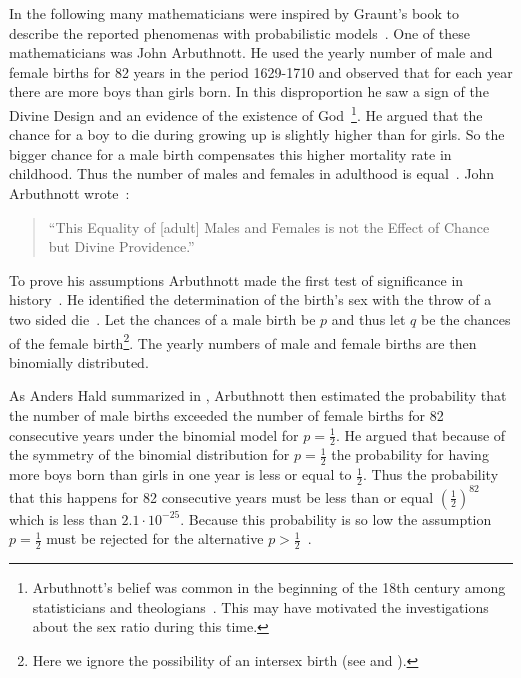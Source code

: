 In the following many mathematicians were inspired by Graunt's book to describe the reported phenomenas with probabilistic models~\cite[p. 275]{hald1}. One of these mathematicians was John Arbuthnott. He used the yearly number of male and female births for 82 years in the period 1629-1710 and observed that for each year there are more boys than girls born. In this disproportion he saw a sign of the Divine Design and an evidence of the existence of God~\cite[p. 277]{hald1}\footnote{Arbuthnott's belief was common in the beginning of the 18th century among statisticians and theologians~\cite[p.~285]{hald1}. This may have motivated the investigations about the sex ratio during this time.}. He argued that the chance for a boy to die during growing up is slightly higher than for girls. So the bigger chance for a male birth compensates this higher mortality rate in childhood. Thus the number of males and females in adulthood is equal~\cite[p. 277]{hald1}. John Arbuthnott wrote~\cite[p. 275]{hald1}:

\begin{quote}
    ``This Equality of [adult] Males and Females is not the Effect of Chance but Divine Providence.''
\end{quote}

To prove his assumptions Arbuthnott made the first test of significance in history~\cite[p. 276]{hald1}. He identified the determination of the birth's sex with the throw of a two sided die~\cite[pp. 275-276]{hald1}. Let the chances of a male birth be $p$ and thus let $q$ be the chances of the female birth\footnote{Here we ignore the possibility of an intersex birth (see \cite{wiki:intersex} and \cite{wiki:transgender}).}. The yearly numbers of male and female births are then binomially distributed.

As Anders Hald summarized in \cite[p. 278]{hald1}, Arbuthnott then estimated the probability that the number of male births exceeded the number of female births for 82 consecutive years under the binomial model for $p=\tfrac 12$. He argued that because of the symmetry of the binomial distribution for $p=\tfrac 12$ the probability for having more boys born than girls in one year is less or equal to $\tfrac 12$. Thus the probability that this happens for 82 consecutive years must be less than or equal $\left(\tfrac 12\right)^{82}$ which is less than $2.1\cdot 10^{-25}$. Because this probability is so low the assumption $p=\tfrac 12$ must be rejected for the alternative $p > \tfrac 12$~\cite[p. 278]{hald1}.


